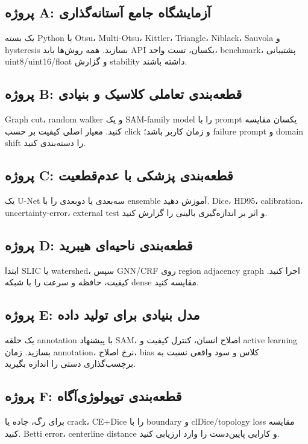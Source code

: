 \documentclass[12pt,openany,oneside]{book}
\begin{document}
\subsection{پروژه A: آزمایشگاه جامع آستانه‌گذاری}
یک بسته Python با Otsu، Multi-Otsu، Kittler، Triangle، Niblack، Sauvola و hysteresis بسازید. همه روش‌ها باید API
یکسان، تست واحد، benchmark، پشتیبانی uint8/uint16/float و گزارش stability داشته باشند.

\subsection{پروژه B: قطعه‌بندی تعاملی کلاسیک و بنیادی}
Graph cut، random walker و یک SAM-family model را با prompt یکسان مقایسه کنید. معیار اصلی کیفیت بر حسب click و
زمان کاربر باشد؛ failure prompt و domain shift را دسته‌بندی کنید.

\subsection{پروژه C: قطعه‌بندی پزشکی با عدم‌قطعیت}
یک U-Net سه‌بعدی یا دوبعدی را با ensemble آموزش دهید. Dice، HD95، calibration، uncertainty-error، external test و
اثر بر اندازه‌گیری بالینی را گزارش کنید.

\subsection{پروژه D: قطعه‌بندی ناحیه‌ای هیبرید}
ابتدا SLIC یا watershed، سپس GNN/CRF روی region adjacency graph اجرا کنید. کیفیت، حافظه و سرعت را با شبکه dense
مقایسه کنید.

\subsection{پروژه E: مدل بنیادی برای تولید داده}
یک حلقه annotation با پیشنهاد SAM، اصلاح انسان، کنترل کیفیت و active learning بسازید. زمان annotation، نرخ اصلاح،
bias کلاس و سود واقعی نسبت به برچسب‌گذاری دستی را اندازه بگیرید.

\subsection{پروژه F: قطعه‌بندی توپولوژی‌آگاه}
برای رگ، جاده یا crack، CE+Dice را با boundary و clDice/topology loss مقایسه کنید. Betti error، centerline distance و
کارایی پایین‌دست را وارد ارزیابی کنید.
\end{document}
